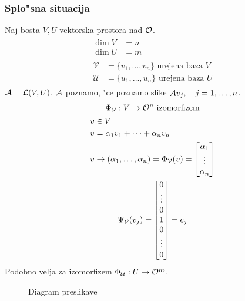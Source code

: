 \subsubsection{Splo"sna situacija}
Naj bosta $V, U$ vektorska prostora nad $\mathcal{O}$. 
\begin{gather*}
\begin{aligned}
\dim V &= n\\
\dim U &= m
\end{aligned} \\
\begin{aligned}
\mathcal{V} &= \{v_1, \ldots, v_n\} \text{ urejena baza $V$} \\
\mathcal{U} &= \{u_1, \ldots, u_n\} \text{ urejena baza $U$}
\end{aligned}
\end{gather*}
$\mathcal{A} = \mathcal{L}(V, U)$, $\mathcal{A}$ poznamo, "ce poznamo slike $\mathcal{A} v_j, \quad j = 1, \ldots, n$.
\begin{gather*}
\Phi_\mathcal{V}: V \to \mathcal{O}^n \text{ izomorfizem} \\
\begin{aligned}
v &\in V \\
v &= \alpha_1 v_1 + \cdots + \alpha_n v_n \\
v &\to (\alpha_1, \ldots, \alpha_n) = \Phi_\mathcal{V}(v) = \begin{bmatrix}\alpha_1 \\ \vdots \\ \alpha_n\end{bmatrix}
\end{aligned} \\
\Psi_{\mathcal{V}}(v_j) = \begin{bmatrix}0 \\ \vdots \\ 0 \\ 1 \\ 0 \\ \vdots \\ 0\end{bmatrix} = e_j
\end{gather*}
Podobno velja za izomorfizem $\Phi_\mathcal{U}: U \to \mathcal{O}^m$.
\begin{figure}[!htbp]
	\centering
	\caption{Diagram preslikave}
\end{figure}

